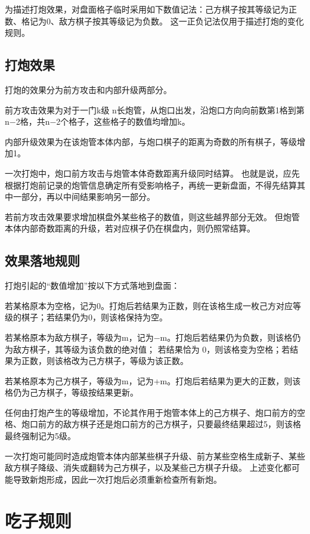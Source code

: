 \documentclass[12pt]{ctexart}
\begin{document}
为描述打炮效果，对盘面格子临时采用如下数值记法：己方棋子按其等级记为正数、格记为0、敌方棋子按其等级记为负数。
这一正负记法仅用于描述打炮的变化规则。

\subsection{打炮效果}

打炮的效果分为前方攻击和内部升级两部分。

前方攻击效果为对于一门k级 n长炮管，从炮口出发，沿炮口方向向前数第1格到第n−2格，共n−2个格子，这些格子的数值均增加k。

内部升级效果为在该炮管本体内部，与炮口棋子的距离为奇数的所有棋子，等级增加1。

一次打炮中，炮口前方攻击与炮管本体奇数距离升级同时结算。
也就是说，应先根据打炮前记录的炮管信息确定所有受影响格子，再统一更新盘面，不得先结算其中一部分，再以中间结果影响另一部分。

若前方攻击效果要求增加棋盘外某些格子的数值，则这些越界部分无效。
但炮管本体内部奇数距离的升级，若对应棋子仍在棋盘内，则仍照常结算。

\subsection{效果落地规则}

打炮引起的“数值增加”按以下方式落地到盘面：

若某格原本为空格，记为0。打炮后若结果为正数，则在该格生成一枚己方对应等级的棋子；若结果仍为0，则该格保持为空。

若某格原本为敌方棋子，等级为m，记为−m。打炮后若结果仍为负数，则该格仍为敌方棋子，其等级为该负数的绝对值；
若结果恰为 0，则该格变为空格；若结果为正数，则该格改为己方棋子，等级为该正数。

若某格原本为己方棋子，等级为m，记为+m。打炮后若结果为更大的正数，则该格仍为己方棋子，等级按结果更新。

任何由打炮产生的等级增加，不论其作用于炮管本体上的己方棋子、炮口前方的空格、炮口前方的敌方棋子还是炮口前方的己方棋子，只要最终结果超过5，则该格最终强制记为5级。

一次打炮可能同时造成炮管本体内部某些棋子升级、前方某些空格生成新子、某些敌方棋子降级、消失或翻转为己方棋子，以及某些己方棋子升级。
上述变化都可能导致新炮形成，因此一次打炮后必须重新检查所有新炮。

\section{吃子规则}
\end{document}
